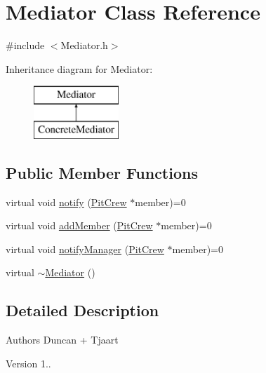 \hypertarget{class_mediator}{}\section{Mediator Class Reference}
\label{class_mediator}


{\ttfamily \#include $<$Mediator.\+h$>$}

Inheritance diagram for Mediator\+:\begin{figure}[H]
\begin{center}
\leavevmode
\includegraphics[height=2.000000cm]{class_mediator}
\end{center}
\end{figure}
\subsection*{Public Member Functions}
\begin{DoxyCompactItemize}
\item 
virtual void \mbox{\hyperlink{class_mediator_acd0f8876148e8aef1f03a80072832bf8}{notify}} (\mbox{\hyperlink{class_pit_crew}{Pit\+Crew}} $\ast$member)=0
\item 
virtual void \mbox{\hyperlink{class_mediator_af3c7f586db4b837962101612555caf6f}{add\+Member}} (\mbox{\hyperlink{class_pit_crew}{Pit\+Crew}} $\ast$member)=0
\item 
virtual void \mbox{\hyperlink{class_mediator_a044f7032c52ca2359f98b798ccd555d3}{notify\+Manager}} (\mbox{\hyperlink{class_pit_crew}{Pit\+Crew}} $\ast$member)=0
\item 
virtual \mbox{\hyperlink{class_mediator_a445a0fa333ce54ec836e3c8a04276272}{$\sim$\+Mediator}} ()
\end{DoxyCompactItemize}


\subsection{Detailed Description}
\begin{DoxyAuthor}{Authors}
Duncan + Tjaart 
\end{DoxyAuthor}
\begin{DoxyVersion}{Version}
1.. 
\end{DoxyVersion}


